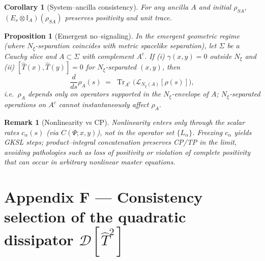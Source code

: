 \documentclass[12pt,a4paper]{article}
\newtheorem{proposition}{Proposition}[section]
\newtheorem{corollary}{Corollary}[section]
\newtheorem{remark}{Remark}[section]
\renewcommand{\Tr}{\operatorname{Tr}}
\numberwithin{equation}{section}
\begin{document}
\begin{corollary}[System–ancilla consistency]\label{cor:H-ancilla}
For any ancilla $A$ and initial $\rho_{SA}$, $(E_s\!\otimes\!\mathbb I_A)(\rho_{SA})$ preserves positivity and unit trace.
\end{corollary}

\begin{proposition}[Emergent no–signaling]\label{prop:H-nosig}
In the emergent geometric regime (where $N_\xi$-separation coincides with metric spacelike separation), let $\Sigma$ be a Cauchy slice and $A\subset\Sigma$ with complement $A^c$. If (i) $\gamma(x,y)=0$ outside $N_\xi$ and (ii) $[\hat T(x),\hat T(y)]=0$ for $N_\xi$-separated $(x,y)$, then
\[
\frac{d}{ds}\rho_A(s)\;=\;\Tr_{A^c}\big(\mathcal L_{N_\xi(A)}[\rho(s)]\big),
\]
i.e.\ $\rho_A$ depends only on operators supported in the $N_\xi$-envelope of $A$; $N_\xi$-separated operations on $A^c$ cannot instantaneously affect $\rho_A$.
\end{proposition}

\begin{remark}[Nonlinearity vs CP]
Nonlinearity enters only through the \emph{scalar} rates $c_\alpha(s)$ (via $C(\Psi;x,y)$), not in the operator set $\{L_\alpha\}$. Freezing $c_\alpha$ yields GKSL steps; product–integral concatenation preserves CP/TP in the limit, avoiding pathologies such as loss of positivity or violation  of complete positivity that can occur in arbitrary nonlinear  master equations.
\end{remark}
\endgroup

\section*{Appendix F — Consistency selection of the quadratic dissipator \texorpdfstring{$\mathcal D[\hat T^2]$}{D[T\textasciicircum 2]}}
\label{app:QuadSelection}

\begingroup
\setcounter{equation}{0}
\renewcommand\theequation{F.\arabic{equation}}
\renewcommand{\theHequation}{F.\arabic{equation}}
\setcounter{theorem}{0}
\renewcommand\thetheorem{F.\arabic{theorem}}
\renewcommand{\theHtheorem}{F.\arabic{theorem}}
\setcounter{lemma}{0}
\renewcommand\thelemma{F.\arabic{lemma}}
\renewcommand{\theHlemma}{F.\arabic{lemma}}
\setcounter{remark}{0}
\renewcommand\theremark{F.\arabic{remark}}
\renewcommand{\theHremark}{F.\arabic{remark}}
\setcounter{proposition}{0}
\renewcommand\theproposition{F.\arabic{proposition}}
\renewcommand{\theHproposition}{F.\arabic{proposition}}
\end{document}
